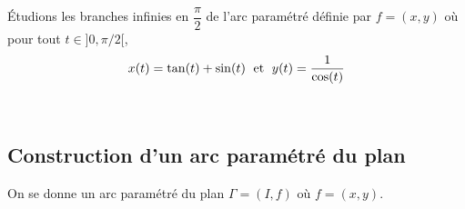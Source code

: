 \documentclass[a4paper,10pt]{report}
\begin{document}
\begin{Exemple} Étudions les branches infinies en $\dfrac{\pi}{2}$ de l'arc paramétré définie par $f=(x,y)$ où pour tout $t \in ]0, \pi/2[$,
$$ x(t) = \tan(t)+\sin(t) \; \hbox{ et } \; y(t)=\dfrac{1}{\cos(t)}$$

\vspace{8cm}
\end{Exemple}

\newpage

$\phantom{test}$

\vspace{5cm}

\subsection{Construction d'un arc paramétré  du plan}
On se donne un arc paramétré du plan $\Gamma =(I,f)$ où $f=(x,y)$.
\end{document}
